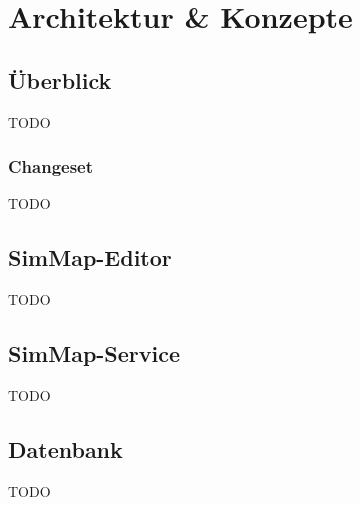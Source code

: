 \chapter{Architektur \& Konzepte}
\section{Überblick}
\begin{flushleft}
TODO
\end{flushleft}
\subsection{Changeset}
\begin{flushleft}
TODO
\end{flushleft}
\section{SimMap-Editor}
\begin{flushleft}
TODO
\end{flushleft}
\section{SimMap-Service}
\begin{flushleft}
TODO
\end{flushleft}
\section{Datenbank}
\begin{flushleft}
TODO
\end{flushleft}